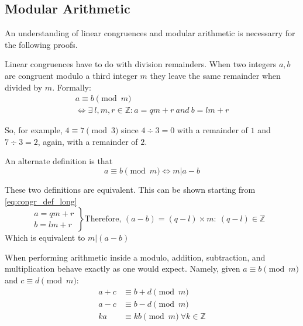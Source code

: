 \documentclass[12pt, titlepage]{article}
\begin{document}
    \subsection{Modular Arithmetic}
    An understanding of linear congruences and modular arithmetic is
    necessarry for the following proofs.

    Linear congruences have to do with division remainders. When two
    integers $a, b$ are congruent modulo a third integer $m$ they leave the
    same remainder when divided by $m$. Formally:
    \begin{equation}\label{eq:congr_def_long}
        \begin{gathered}
            a \equiv b \pmod{m} \\
            \iff \exists\ l,m,r \in \mathbb{Z}: a = qm + r\ and\ b = lm + r
        \end{gathered}
    \end{equation}

    So, for example, $4 \equiv 7 \pmod{3}$ since $4 \div 3 = 0$ with
    a remainder of $1$ and $7 \div 3 = 2$, again, with a remainder of $2$.

    An alternate definition is that
    \begin{equation*}
        a \equiv b \pmod{m} \iff m | a-b
    \end{equation*}

    These two definitions are equivalent. This can be shown starting from 
    \eqref{eq:congr_def_long}
%
    \begin{equation*}
        \left. 
            \begin{aligned}
                a = qm + r\\ 
                b = lm + r
            \end{aligned}
        \right\}
        \text{Therefore, }
        (a - b) = (q-l)\times m :\: (q-l) \in \mathbb{Z}\quad
    \end{equation*}
    Which is equivalent to $m | (a-b)$

    When performing arithmetic inside a modulo, addition, subtraction, and
    multiplication behave exactly as one would expect. Namely, given
    $a\equiv b\pmod{m}$ and $c\equiv d\pmod{m}$:
    \begin{align*}
        a + c &\equiv b + d \pmod{m}\\
        a - c &\equiv b - d \pmod{m}\\
        ka 	  &\equiv kb \pmod{m}\ \forall k \in \mathbb{Z} 
    \end{align*}
\end{document}
